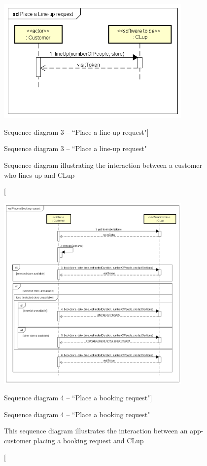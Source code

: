 \documentclass[a4paper,oneside,11pt]{book}   %
\newcommand{\captionrasd}[2]{\caption[#1]{#1 \par \small #2}}
\begin{document}
    \begin{figure}[H]
        \centering
        \includegraphics[width=0.85\textwidth, keepaspectratio]{pictures/sequence_diagrams/place_line-up_request}
        \captionrasd{Sequence diagram 3 -- ``Place a line-up request"}{Sequence diagram illustrating the interaction between a customer who lines up and CLup}
        \label{figure:sequence_diagram_3_place_lineup_request}
    \end{figure}
    
    \begin{figure}[H]
        \centering
        \includegraphics[width=0.85\textwidth, keepaspectratio]{pictures/sequence_diagrams/place_booking_request}
        \captionrasd{Sequence diagram 4 -- ``Place a booking request"}{This sequence diagram illustrates the interaction between an app-customer placing a booking request and CLup}
        \label{figure:sequence_diagram_4_place_booking_request}
    \end{figure}
\end{document}
